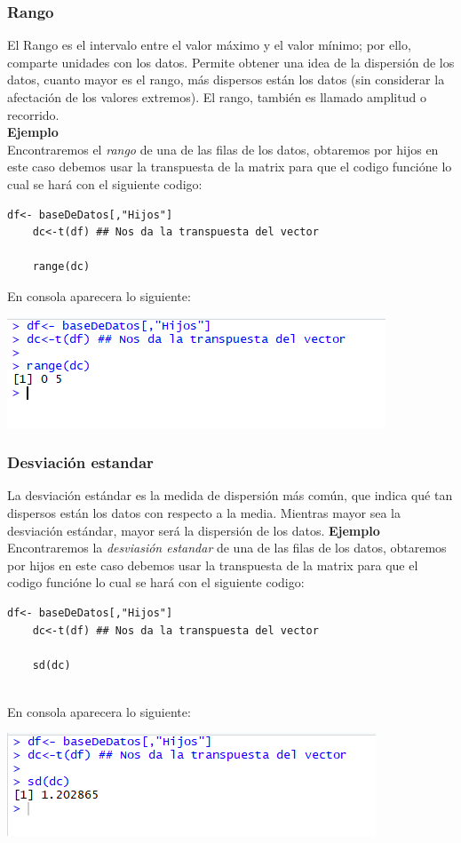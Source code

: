 \documentclass[12pt,hidelinks]{article}
\begin{document}
	\subsubsection{Rango}
	El Rango es el intervalo entre el valor máximo y el valor mínimo; por ello, comparte unidades con los datos. Permite obtener una idea de la dispersión de los datos, cuanto mayor es el rango, más dispersos están los datos (sin considerar la afectación de los valores extremos). El rango, también es llamado amplitud o recorrido.\\
	\textbf{Ejemplo}\\
	\vspace{2mm}
	Encontraremos el \textit{rango} de una de las filas de los datos, obtaremos por hijos  en este caso debemos usar la transpuesta de la matrix para que el codigo funcióne lo cual se hará con el siguiente codigo:
	\begin{lstlisting}[frame=single]
	df<- baseDeDatos[,"Hijos"]
	dc<-t(df) ## Nos da la transpuesta del vector
	
	range(dc)
	\end{lstlisting}
	En consola aparecera lo siguiente:
	\begin{center}
		\includegraphics[]{Rango.PNG}
	\end{center}
	
	\subsubsection{Desviación estandar}
	La desviación estándar es la medida de dispersión más común, que indica qué tan dispersos están los datos con respecto a la media. Mientras mayor sea la desviación estándar, mayor será la dispersión de los datos.\newpage
	\textbf{Ejemplo}\\
	\vspace{2mm}
	Encontraremos la \textit{desviasión estandar} de una de las filas de los datos, obtaremos por hijos  en este caso debemos usar la transpuesta de la matrix para que el codigo funcióne lo cual se hará con el siguiente codigo:
	\begin{lstlisting}[frame=single]
	df<- baseDeDatos[,"Hijos"]
	dc<-t(df) ## Nos da la transpuesta del vector
	
	sd(dc)
	
	\end{lstlisting}
	En consola aparecera lo siguiente:
	\begin{center}
		\includegraphics[]{Desviacion_estandar.PNG}
	\end{center}
	
\end{document}
